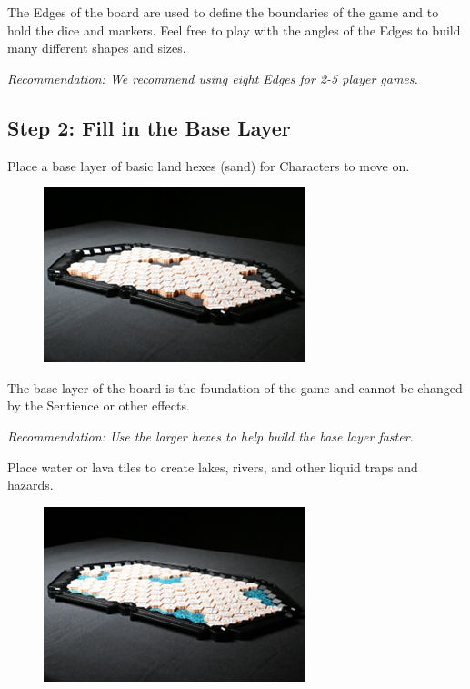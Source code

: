 \documentclass[../main.tex]{subfiles}
\begin{document}
The Edges of the board are used to define the boundaries of the game and to hold the dice and markers. Feel free to play with the angles of the Edges to build many different shapes and sizes.

\textit{Recommendation: We recommend using eight Edges for 2-5 player games.}

\subsection{Step 2:  Fill in the Base Layer}
Place a base layer of basic land hexes (sand) for Characters to move on.

\begin{figure}[h]
    \tsgap
    \centering
    \includegraphics[width=1\linewidth]{baselayer.png}
\end{figure}

The base layer of the board is the foundation of the game and cannot be changed by the Sentience or other effects.

\textit{Recommendation: Use the larger hexes to help build the base layer faster.}

Place water or lava tiles to create lakes, rivers, and other liquid traps and hazards. 

\begin{figure}[h]
    \tsgap
    \centering
    \includegraphics[width=1\linewidth]{chapters//boardsetup/watersetup.png}
\end{figure}
\end{document}
